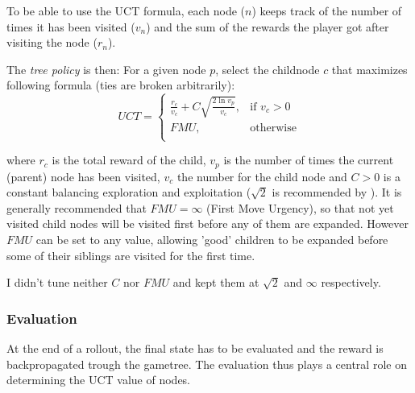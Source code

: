 To be able to use the UCT formula, each node ($n$) keeps track of the number of times it has been visited ($v_n$) and the sum of the rewards the player got after visiting the node ($r_n$).

The \textit{tree policy} is then:
For a given node $p$, select the childnode $c$ that maximizes following formula (ties are broken arbitrarily):
$$
UCT =
\begin{cases}
    \frac{r_c}{v_c} + C\sqrt{\frac{2\ln v_p}{v_c}}, & \text{if } v_c > 0 \\
    FMU, & \text{otherwise} \\
\end{cases}
$$

where $r_c$ is the total reward of the child, $v_p$ is the number of times the current (parent) node has been visited, $v_c$ the number for the child node and $C > 0$ is a constant balancing exploration and exploitation ($\sqrt{2}$ is recommended by \cite{ismcts}). \newline
It is generally recommended that $FMU = \infty$ (First Move Urgency), so that not yet visited child nodes will be visited first before any of them are expanded. However $FMU$ can be set to any value, allowing 'good' children to be expanded before some of their siblings are visited for the first time.

I didn't tune neither $C$ nor $FMU$ and kept them at $\sqrt{2}$ and $\infty$ respectively.


\subsubsection{Evaluation}
\label{sssec:evaluation}
At the end of a rollout, the final state has to be evaluated and the reward is backpropagated trough the gametree. The evaluation thus plays a central role on determining the UCT value of nodes.


